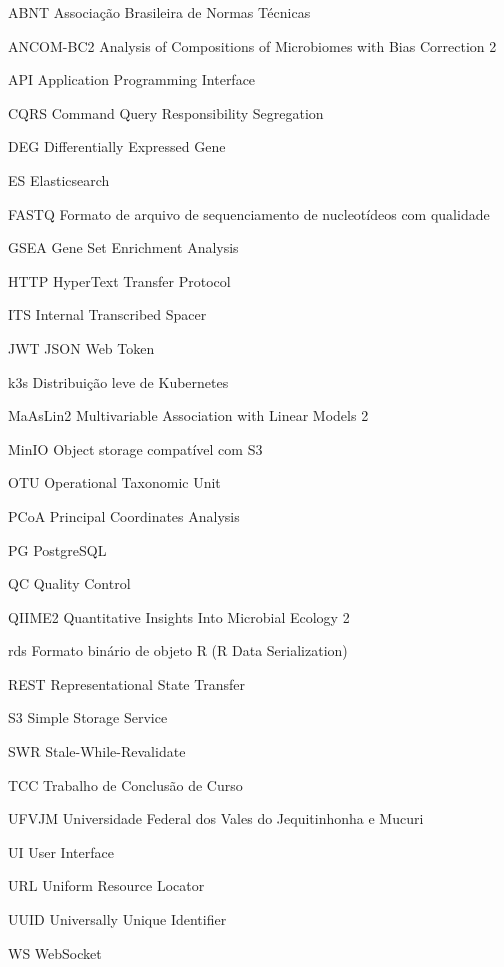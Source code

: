 \documentclass[12pt,a4paper,oneside,sumario=abnt-6027-2012,chapter=TITLE]{UFVJM-abntex2}
\begin{document}
\begin{siglas}
  \item[ABNT]  Associação Brasileira de Normas Técnicas
  \item[ANCOM-BC2] Analysis of Compositions of Microbiomes with Bias Correction 2
  \item[API]   Application Programming Interface
  \item[CQRS]  Command Query Responsibility Segregation
  \item[DEG]   Differentially Expressed Gene
  \item[ES]    Elasticsearch
  \item[FASTQ] Formato de arquivo de sequenciamento de nucleotídeos com qualidade
  \item[GSEA]  Gene Set Enrichment Analysis
  \item[HTTP]  HyperText Transfer Protocol
  \item[ITS]   Internal Transcribed Spacer
  \item[JWT]   JSON Web Token
  \item[k3s]   Distribuição leve de Kubernetes
  \item[MaAsLin2] Multivariable Association with Linear Models 2
  \item[MinIO] Object storage compatível com S3
  \item[OTU]   Operational Taxonomic Unit
  \item[PCoA]  Principal Coordinates Analysis
  \item[PG]    PostgreSQL
  \item[QC]    Quality Control
  \item[QIIME2] Quantitative Insights Into Microbial Ecology 2
  \item[rds]   Formato binário de objeto R (R Data Serialization)
  \item[REST]  Representational State Transfer
  \item[S3]    Simple Storage Service
  \item[SWR]   Stale-While-Revalidate
  \item[TCC]   Trabalho de Conclusão de Curso
  \item[UFVJM] Universidade Federal dos Vales do Jequitinhonha e Mucuri
  \item[UI]    User Interface
  \item[URL]   Uniform Resource Locator
  \item[UUID]  Universally Unique Identifier
  \item[WS]    WebSocket
\end{siglas}

\tableofcontents*
\newpage

\textual
\pagestyle{simple}










\end{document}
